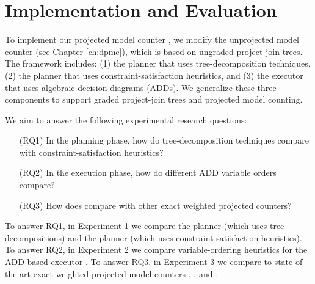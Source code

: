 \section{Implementation and Evaluation}
\label{sec:procount:experiments}

To implement our projected model counter \procount, we modify the unprojected model counter \dpmc{} (see Chapter \ref{ch:dpmc}), which is based on ungraded project-join trees.
The \dpmc{} framework includes: 
(1) the \Lg{} planner that uses tree-decomposition techniques, 
(2) the \htb{} planner that uses constraint-satisfaction heuristics, and
(3) the \dmc{} executor that uses algebraic decision diagrams (ADDs).
We generalize these three components to support graded project-join trees and projected model counting.

We aim to answer the following experimental research questions:
\begin{enumerate}
    \item[(RQ1)] In the planning phase, how do tree-decomposition techniques compare with constraint-satisfaction heuristics?
    \item[(RQ2)] In the execution phase, how do different ADD variable orders compare?
    \item[(RQ3)] How does \procount{} compare with other exact weighted projected counters?
\end{enumerate}

To answer RQ1, in Experiment 1 we compare the planner \Lg{} (which uses tree decompositions) and the planner \htb{} (which uses constraint-satisfaction heuristics). To answer RQ2, in Experiment 2 we compare variable-ordering heuristics for the ADD-based executor \dmc.
To answer RQ3, in Experiment 3 we compare \procount{} to state-of-the-art exact weighted projected model counters \dfp{} \cite{lagniez2019recursive}, \projmc{} \cite{lagniez2019recursive}, and \ssat{} \cite{lee2017solving}.



